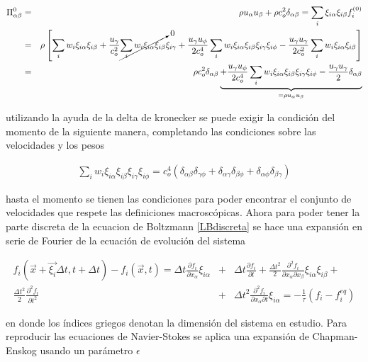 \begin{eqnarray}
\Pi_{\alpha\beta}^{0}&=&\rho u_{\alpha}u_{\beta}+\rho c_{o}^{2}\delta_{\alpha\beta}=\sum_{i}\xi_{i\alpha}\xi_{i\beta}f_{i}^{(0)}\nonumber\\
&=&\rho\left[\sum_{i}w_{i}\xi_{i\alpha}\xi_{i\beta} + \frac{u_{\gamma}}{c_{o}^{2}}\cancelto{0}{\sum_{i}w_{i}\xi_{i\alpha}\xi_{i\beta}}\xi_{i\gamma}+\frac{u_{\gamma}u_{\phi}}{2c_{o}^{4}}\sum_{i}w_{i}\xi_{i\alpha}\xi_{i\beta}\xi_{i\gamma}\xi_{i\phi}-\frac{u_{\gamma}u_{\gamma}}{2c_{o}^{2}}\sum_{i}w_{i}\xi_{i\alpha}\xi_{i\beta}\right]\nonumber\\
&=&\rho c_{o}^{2}\delta_{\alpha\beta}\underbrace{+\frac{u_{\gamma}u_{\phi}}{2c_{o}^{4}}\sum_{i}w_{i}\xi_{i\alpha}\xi_{i\beta}\xi_{i\gamma}\xi_{i\phi}-\frac{u_{\gamma}u_{\gamma}}{2}\delta_{\alpha\beta}}_{=\rho u_{\alpha}u_{\beta}}
\end{eqnarray}

\noindent utilizando la ayuda de la delta de kronecker se puede exigir la condición del momento de la siguiente manera, completando las condiciones sobre las velocidades y los pesos

\begin{eqnarray}
\sum_{i}w_{i}\xi_{i\alpha}\xi_{i\beta}\xi_{i\gamma}\xi_{i\phi} = c_{o}^{4}(\delta_{\alpha\beta}\delta_{\gamma\phi}+\delta_{\alpha\gamma}\delta_{\beta\phi}+\delta_{\alpha\phi}\delta_{\beta\gamma})
\end{eqnarray}

\noindent hasta el momento se tienen las condiciones para poder encontrar el conjunto de velocidades que respete las definiciones macroscópicas. Ahora para poder tener la parte discreta de la ecuacion de Boltzmann \eqref{LBdiscreta} se hace una expansión en serie de Fourier de la ecuación de evolución del sistema 

\begin{eqnarray}
\label{expansion}
f_{i}(\vec{x}+\vec{\xi_{i}}\Delta t, t + \Delta t)-f_{i}(\vec{x},t) = \Delta t \frac{\partial f_{i}}{\partial x_{\alpha}}\xi_{i\alpha} &+& \Delta t \frac{\partial f_{i}}{\partial t} + \frac{\Delta t^{2}}{2}\frac{\partial^{2}f_{i}}{\partial x_{\alpha} \partial x_{\beta}}\xi_{i\alpha}\xi_{i\beta}+\nonumber\\\frac{\Delta t^{2}}{2}\frac{\partial^{2}f_{i}}{\partial t^{2}}
&+& \Delta t^{2} \frac{\partial^{2}f_{i}}{\partial x_{\alpha}\partial t}\xi_{i\alpha} = -\frac{1}{\tau}(f_{i}-f^{eq}_{i})
\end{eqnarray}

\noindent en donde los índices griegos denotan la dimensión del sistema en estudio. Para reproducir las ecuaciones de Navier-Stokes se aplica una expansión de Chapman-Enskog usando un parámetro $\epsilon$


